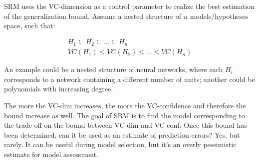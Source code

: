 SRM uses the VC-dimension as a control parameter to realize the best estimation of the generalization bound. Assume a nested structure of $n$ models/hypotheses space, such that: 

\begin{gather*}
    H_1 \subseteq H_2 \subseteq \dots \subseteq H_n \\
    VC(H_1) \leq VC(H_2) \leq \dots \leq VC(H_n)
\end{gather*}

An example could be a nested structure of neural networks, where each $H_i$ corresponds to a network containing a different number of units; another could be polynomials with increasing degree.

The more the VC-dim increases, the more the VC-confidence and therefore the bound increase as well. The goal of SRM is to find the model corresponding to the trade-off on the bound between VC-dim and VC-conf. Once this bound has been determined, can it be used as an estimate of prediction errors? Yes, but rarely. It can be useful during model selection, but it's an overly pessimistic estimate for model assessment.
